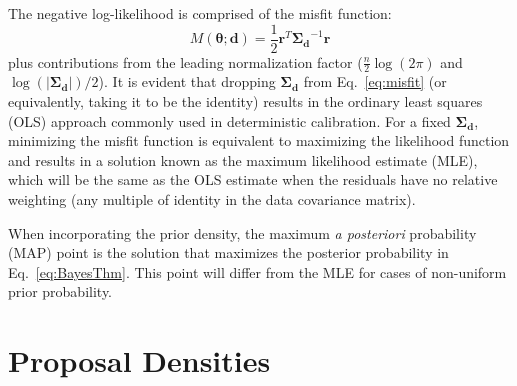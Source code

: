 The negative log-likelihood is comprised of the misfit function:
\begin{equation}
M(\boldsymbol{\theta;d}) = \frac{1}{2} \boldsymbol{r}^T \boldsymbol{\Sigma_d}^{-1} 
\boldsymbol{r} %
\label{eq:misfit}
\end{equation}
plus contributions from the leading normalization factor 
($\frac{n}{2}\log(2\pi)$ and $\log(|\boldsymbol{\Sigma_d}|)/2$).
It is evident that dropping $\boldsymbol{\Sigma_d}$ from Eq.~\ref{eq:misfit} 
(or equivalently, taking it to be the identity) results in
the ordinary least squares (OLS) approach commonly used in
deterministic calibration.  For a fixed $\boldsymbol{\Sigma_d}$, minimizing the misfit 
function is equivalent to maximizing the likelihood function and results 
in a solution known as the maximum likelihood estimate (MLE), which will 
be the same as the OLS estimate when the residuals have no relative
weighting (any multiple of identity in the data covariance matrix).

When incorporating the prior density, the maximum {\it a posteriori}
probability (MAP) point is the solution that maximizes the posterior
probability in Eq.~\ref{eq:BayesThm}.  This point will differ
from the MLE for cases of non-uniform prior probability.


\section{Proposal Densities} \label{uq:bayes:prop}


